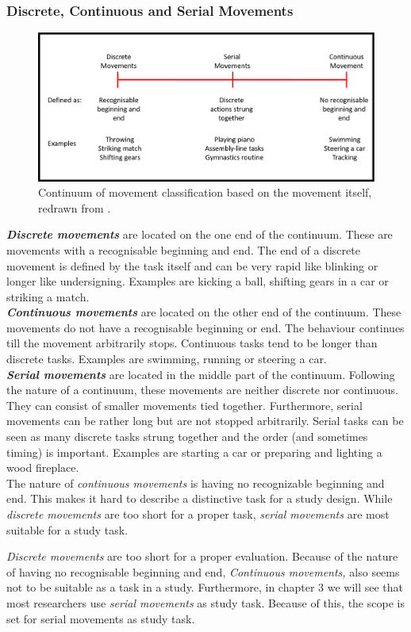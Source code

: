 \subsubsection{Discrete, Continuous and Serial Movements}
\begin{figure}[h]
	\centering
	\includegraphics[width=1.0\textwidth]{img/movement_classification.png}
	\caption{Continuum of movement classification based on the movement itself, redrawn from \cite{Schmidt2011}.}
	\label{fig:movements_cont}
\end{figure}
\textit{\textbf{Discrete movements}} are located on the one end of the continuum. These are movements with a recognisable beginning and end. The end of a discrete movement is defined by the task itself and can be very rapid like blinking or longer like undersigning. Examples are kicking a ball, shifting gears in a car or striking a match.\\
\textit{\textbf{Continuous movements}} are located on the other end of the continuum. These movements do not have a recognisable beginning or end. The behaviour continues till the movement arbitrarily stops. Continuous tasks tend to be longer than discrete tasks. Examples are swimming, running or steering a car.\\
\textit{\textbf{Serial movements}} are located in the middle part of the continuum. Following the nature of a continuum, these movements are neither discrete nor continuous. They can consist of smaller movements tied together. Furthermore, serial movements can be rather long but are not stopped arbitrarily. Serial tasks can be seen as many discrete tasks strung together and the order (and sometimes timing) is important. Examples are starting a car or preparing and lighting a wood fireplace.\\
The nature of \textit{continuous movements} is having no recognizable beginning and end. This makes it hard to describe a distinctive task for a study design. While \textit{discrete movements} are too short for a proper task, \textit{serial movements} are most suitable for a study task.\\
\begin{tcolorbox}[colback=red!30!white]
\textit{Discrete movements} are too short for a proper evaluation. Because of the nature of having no recognisable beginning and end, \textit{Continuous movements,} also seems not to be suitable as a task in a study. Furthermore, in chapter 3 we will see that most researchers use \textit{serial movements} as study task. Because of this, the scope is set for serial movements as study task.
\end{tcolorbox}

